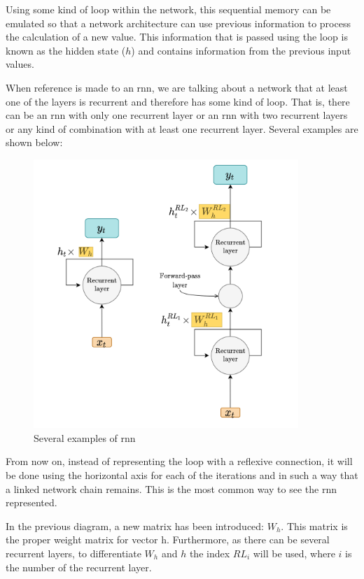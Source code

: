 Using some kind of loop within the network, this sequential memory can be emulated so that a network architecture can use previous information to process the calculation of a new value. This information that is passed using the loop is known as the hidden state ($h$) and contains information from the previous input values.
\newline

When reference is made to an \acrshort{rnn}, we are talking about a network that at least one of the layers is recurrent and therefore has some kind of loop. That is, there can be an \acrshort{rnn} with only one recurrent layer or an \acrshort{rnn} with two recurrent layers or any kind of combination with at least one recurrent layer. Several examples are shown below:

\begin{figure}[H]
    \centering
    \includegraphics[width=10cm]{images/state-of-art/rnn/rnn-compact.png}
    \caption{Several examples of \acrshort{rnn}}
    \label{fig:rnn-compact}
\end{figure}

From now on, instead of representing the loop with a reflexive connection, it will be done using the horizontal axis for each of the iterations and in such a way that a linked network chain remains. This is the most common way to see the \acrshort{rnn} represented.
\newline

In the previous diagram, a new matrix has been introduced: $W_h$. This matrix is the proper weight matrix for vector h. Furthermore, as there can be several recurrent layers, to differentiate $W_h$ and $h$ the index $RL_i$ will be used, where $i$ is the number of the recurrent layer.
